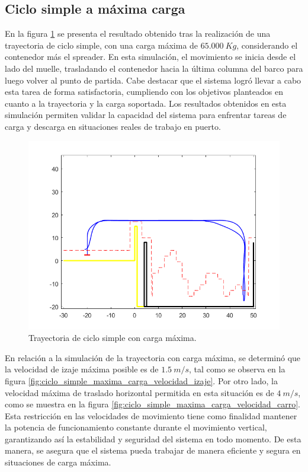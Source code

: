 \documentclass[11pt]{article}
\begin{document}
\subsection{Ciclo simple a máxima carga}

En la figura \ref{fig:ciclo_simple_maxima_carga_trayectoria} se presenta el resultado obtenido tras la realización de una trayectoria de ciclo simple, con una carga máxima de $65.000\ Kg$, considerando el contenedor más el spreader. En esta simulación, el movimiento se inicia desde el lado del muelle, trasladando el contenedor hacia la última columna del barco para luego volver al punto de partida. Cabe destacar que el sistema logró llevar a cabo esta tarea de forma satisfactoria, cumpliendo con los objetivos planteados en cuanto a la trayectoria y la carga soportada. Los resultados obtenidos en esta simulación permiten validar la capacidad del sistema para enfrentar tareas de carga y descarga en situaciones reales de trabajo en puerto.

\begin{figure}[!h]
	\centering
	\includegraphics[width=1\textwidth]{images/ciclo_simple_maxima_carga/trayectoria_completa_xl.png}
	\caption{Trayectoria de ciclo simple con carga máxima.}
	\label{fig:ciclo_simple_maxima_carga_trayectoria}
\end{figure}

En relación a la simulación de la trayectoria con carga máxima, se determinó que la velocidad de izaje máxima posible es de $1.5\ m/s$, tal como se observa en la figura \ref{fig:ciclo_simple_maxima_carga_velocidad_izaje}. Por otro lado, la velocidad máxima de traslado horizontal permitida en esta situación es de $4\ m/s$, como se muestra en la figura \ref{fig:ciclo_simple_maxima_carga_velocidad_carro}. Esta restricción en las velocidades de movimiento tiene como finalidad mantener la potencia de funcionamiento constante durante el movimiento vertical, garantizando así la estabilidad y seguridad del sistema en todo momento. De esta manera, se asegura que el sistema pueda trabajar de manera eficiente y segura en situaciones de carga máxima.
\end{document}
